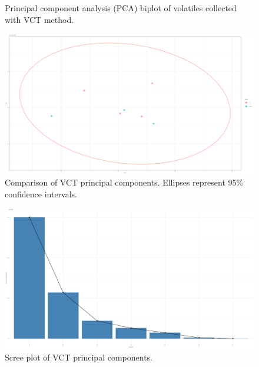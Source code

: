 \documentclass[12pt,final,CPage]{ufthesis}
\begin{document}
{\begin{figure}
  \caption[Principal component analysis (PCA) biplot of volatiles collected with VCT]{Principal component analysis (PCA) biplot of volatiles collected with VCT method.}\label{fig:qsep-vocs}
  \end{figure}
  \begin{figure}

  {\centering \includegraphics[width=1\linewidth]{figure/rrv_volatiles_comparison_pca_comp_qsep} 

  }

  \caption[Comparison of VCT principal components]{Comparison of VCT principal components. Ellipses represent 95\% confidence intervals.}\label{fig:qsep-vocs-compares}
  \end{figure}
  \begin{figure}

  {\centering \includegraphics[width=1\linewidth]{figure/rrv_volatiles_screeplot_pca_qsep} 

  }

  \caption[Scree plot of VCT principal components]{Scree plot of VCT principal components.}\label{fig:qsep-vocs-scree}
  \end{figure}
  \begin{figure}


\end{figure}}
\end{document}
